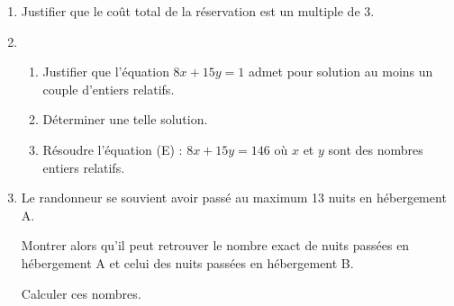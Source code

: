 \documentclass[10pt]{article}
\begin{document}
\begin{enumerate}
\begin{enumerate}
	\end{enumerate}
\item Justifier que le coût total de la réservation est un multiple de 3.
\item 
	\begin{enumerate}
	\item Justifier que l'équation $8x + 15y = 1$ admet pour solution au moins un couple d'entiers relatifs.
	\item Déterminer une telle solution.
	\item Résoudre l'équation (E) : $8x + 15y = 146$ où $x$ et $y$ sont des nombres entiers relatifs.
	\end{enumerate}
\item Le randonneur se souvient avoir passé au maximum 13 nuits en hébergement A.

Montrer alors qu'il peut retrouver le nombre exact de nuits passées en hébergement A et celui des nuits passées en hébergement B.

Calculer ces nombres.
\end{enumerate}
\end{document}
